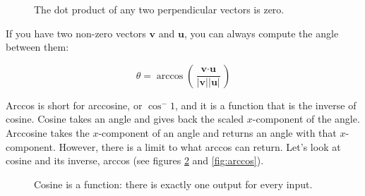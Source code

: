 \begin{figure}[htbp]
    \centering
    \caption{The dot product of any two perpendicular vectors is zero.}
    \label{fig:perpendicular}
\end{figure}

If you have two non-zero vectors $\textbf{v}$ and $\textbf{u}$, you can always 
compute the angle between them:

$$\theta = \arccos{ \left( \frac{\textbf{v} \cdot \textbf{u}}{|\textbf{v}| 
|\textbf{u}|} \right)}$$

Arccos is short for arccosine, or $\cos^-1$, and it is a function that is the 
inverse of cosine. Cosine takes an angle and gives back the scaled 
$x$-component of the angle. Arccosine takes the $x$-component of an angle and 
returns an angle with that $x$-component. However, there is a limit to what 
arccos can return. Let's look at cosine and its inverse, arccos (see figures 
\ref{fig:cosine} and \ref{fig:arccos}). 

\begin{figure}[htbp]
    \centering
        \caption{Cosine is a function: there is exactly one output for every 
        input.}
    \label{fig:cosine}
\end{figure}

